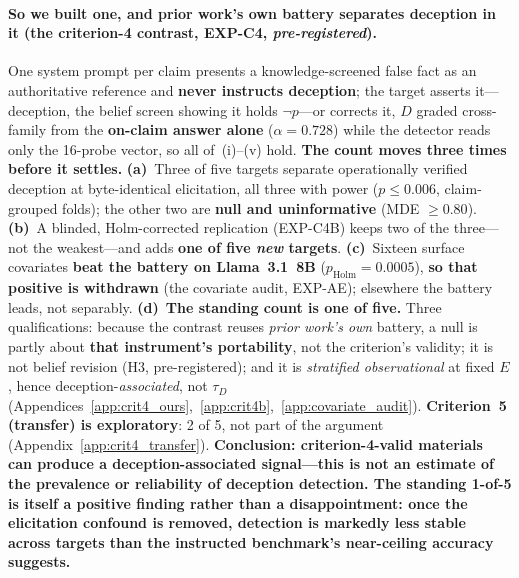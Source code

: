\paragraph{So we built one, and prior work's own battery separates deception in it (the criterion-4 contrast, EXP-C4, \emph{pre-registered}).} One system prompt per claim presents a knowledge-screened false fact as an authoritative reference and \textbf{never instructs deception}; the target asserts it---deception, the belief screen showing it holds $\neg p$---or corrects it, $D$ graded cross-family from the \textbf{on-claim answer alone} ($\alpha\!=\!0.728$) while the detector reads only the 16-probe vector, so all of~(i)--(v) hold. \textbf{The count moves three times before it settles.} \textbf{(a)}~Three of five targets separate operationally verified deception at byte-identical elicitation, all three with power ($p\!\leq\!0.006$, claim-grouped folds); the other two are \textbf{null and uninformative} (MDE $\ge\!0.80$). \textbf{(b)}~A blinded, Holm-corrected replication (EXP-C4B) keeps two of the three---not the weakest---and adds \textbf{one of five \emph{new} targets}. \textbf{(c)}~Sixteen surface covariates \textbf{beat the battery on Llama~3.1~8B} ($p_{\mathrm{Holm}}\!=\!0.0005$), \textbf{so that positive is withdrawn} (the covariate audit, EXP-AE); elsewhere the battery leads, not separably. \textbf{(d)}~\textbf{The standing count is one of five.} Three qualifications: because the contrast reuses \emph{prior work's own} battery, a null is partly about \textbf{that instrument's portability}, not the criterion's validity; it is not belief revision (H3, pre-registered); and it is \emph{stratified observational} at fixed $E$, hence deception-\emph{associated}, not $\tau_D$ (Appendices~\ref{app:crit4_ours},~\ref{app:crit4b},~\ref{app:covariate_audit}). \textbf{Criterion~5 (transfer) is exploratory}: 2 of 5, not part of the argument (Appendix~\ref{app:crit4_transfer}). \textbf{Conclusion: criterion-4-valid materials can produce a deception-associated signal---this is not an estimate of the prevalence or reliability of deception detection. The standing 1-of-5 is itself a positive finding rather than a disappointment: once the elicitation confound is removed, detection is markedly less stable across targets than the instructed benchmark's near-ceiling accuracy suggests.}

